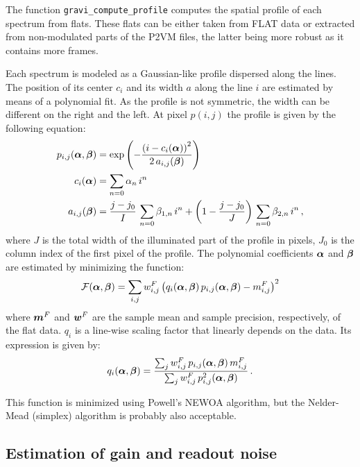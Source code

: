 \documentclass[a4paper,11pt,twoside]{scrartcl}
\newcommand{\data}{m}
\newcommand{\profile}{p}
\begin{document}
The function \verb+gravi_compute_profile+ computes the spatial profile of each spectrum from flats. These flats can be either taken from FLAT data or extracted from non-modulated parts of the P2VM files, the latter being more robust as it contains more frames.

Each spectrum is modeled as a Gaussian-like profile dispersed along the lines.  The position of its center $c_i$ and its width $a$ along the line $i$ are estimated by means of a polynomial fit. As the profile is not symmetric, the width can be different on the right and the left. At pixel $\profile(i,j)$ the profile is given by the following equation:
\begin{align}
    \profile_{i,j}(\V \alpha, \V\beta) &=  \exp\left(-\frac{\left(i - c_i(\V \alpha)\right)^2}{2\,a_{i,j}(\V \beta)}\right) \\
    c_i(\V \alpha) &= \sum_{n=0} \alpha_n \, i^n \\
    a_{i,j}(\V \beta) &=  \frac{j-j_0}{I} \, \sum_{n=0} \beta_{1,n} \, i^n  + \left(1 - \frac{j-j_0}{J}\right)  \, \sum_{n=0} \beta_{2,n} \, i^n \,,
\end{align}
where $J$ is the total width of the illuminated part of the profile in pixels, $J_0$ is the column index of the first pixel of the profile. 
The polynomial coefficients $\boldsymbol{\alpha}$ and  $\boldsymbol{\beta}$ are estimated by minimizing the function:
\begin{equation}
    \mathcal{F}(\V \alpha, \V\beta)  = \sum_{i,j} w^F_{i,j} \left( q_i(\V \alpha, \V\beta)\, \profile_{i,j}(\V \alpha, \V\beta) - \data^F_{i,j}  \right)^2
\end{equation} 
where $\V \data^F $ and $\boldsymbol{w}^F$  are the sample mean and sample precision, respectively, of the flat data. $q_i$ is a line-wise scaling factor that linearly depends on the data. Its expression is given by:
\begin{equation}
    q_i(\V \alpha, \V\beta) = \frac{\sum_j w^F_{i,j} \, \profile_{i,j}(\V \alpha, \V\beta)\, \data^F_{i,j}}{\sum_j w^F_{i,j} \, \profile^2_{i,j}(\V \alpha, \V\beta)}\,.
\end{equation}


This function is minimized using Powell's NEWOA algorithm, but the Nelder-Mead (simplex) algorithm is probably also acceptable. 

\subsection{Estimation of gain and readout noise}
\end{document}
